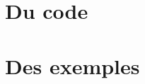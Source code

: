 \documentclass[12pt]{article}
\theoremstyle{definition}\newtheorem{defn}{Définition}
\theoremstyle{definition}\newtheorem{exm}{Exemple}
\theoremstyle{definition}\newtheorem{rem}{Remarque}
\theoremstyle{definition}\newtheorem{algo}{Algorithme}
\theoremstyle{remark}\newtheorem{exo}{Exercice}
\theoremstyle{remark}\newtheorem{nota}{Notation}
\begin{document}
\section{Du code}




\pagebreak
\section{Des exemples}





\pagebreak


\end{document}
